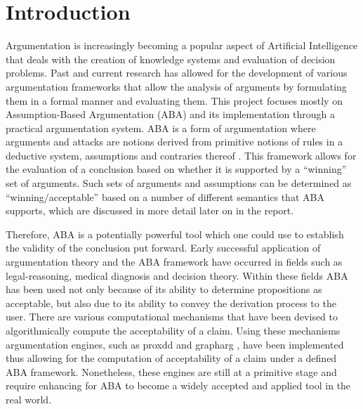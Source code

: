 \newpage

\chapter{Introduction}
Argumentation is increasingly becoming a popular aspect of Artificial Intelligence that deals with the creation of knowledge systems and evaluation of decision problems. Past and current research has allowed for the development of various argumentation frameworks that allow the analysis of arguments by formulating them in a formal manner and evaluating them. This project focuses mostly on Assumption-Based Argumentation (ABA) and its implementation through a practical argumentation system.  ABA is a form of argumentation where arguments and attacks are notions derived from primitive notions of rules in a deductive system, assumptions and contraries thereof \cite{abatut}.  This framework allows for the evaluation of a conclusion based on whether it is supported by a ``winning'' set of arguments. Such sets of arguments and assumptions can be determined as ``winning/acceptable'' based on a number of different semantics that ABA supports, which are discussed in more detail later on in the report. 

Therefore, ABA is a potentially powerful tool which one could use to establish the validity of the conclusion put forward. Early successful application of argumentation theory and the ABA framework have occurred in fields such as legal-reasoning, medical diagnosis and decision theory. Within these fields ABA has been used not only because of its ability to determine propositions as acceptable, but also due to its ability to convey the derivation process to the user. There are various computational mechanisms that have been devised to algorithmically compute the acceptability of a claim. Using these mechanisms argumentation engines, such as proxdd \cite{proxdd} and grapharg \cite{grapharg}, have been implemented thus allowing for the computation of acceptability of a claim under a defined ABA framework. Nonetheless, these engines are still at a primitive stage and require enhancing for ABA to become a widely accepted and applied tool in the real world.


